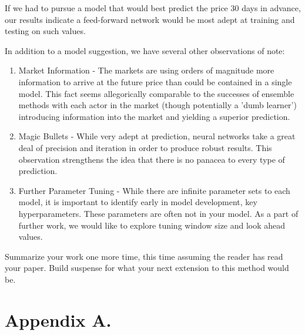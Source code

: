 \documentclass[twoside,11pt]{article}
\begin{document}
If we had to pursue a model that would best predict the price 30 days in advance, our results indicate a feed-forward network would be most adept at training and testing on such values. 

In addition to a model suggestion, we have several other observations of note:

\begin{enumerate}
	\item Market Information - The markets are using orders of magnitude more information to arrive at the future price than could be contained in a single model. This fact seems allegorically comparable to the successes of ensemble methods with each actor in the market (though potentially a 'dumb learner') introducing information into the market and yielding a superior prediction. 
	\item Magic Bullets - While very adept at prediction, neural networks take a great deal of precision and iteration in order to produce robust results. This observation strengthens the idea that there is no panacea to every type of prediction.
	\item Further Parameter Tuning - While there are infinite parameter sets to each model, it is important to identify early in model development, key hyperparameters. These parameters are often not in your model.  As a part of further work, we would like to explore tuning window size and look ahead values. 
\end{enumerate}



Summarize your work one more time, this time assuming the reader has read your paper.
Build suspense for what your next extension to this method would be.




\appendix
\section*{Appendix A.}\label{append}
\end{document}
